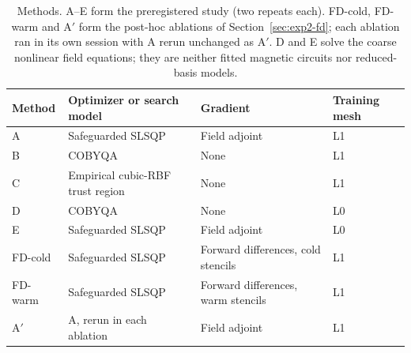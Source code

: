 \begin{table}[H]\centering\small
\caption{Methods. A--E form the preregistered study (two repeats each).
FD-cold, FD-warm and A$'$ form the post-hoc ablations of
Section~\ref{sec:exp2-fd}; each ablation ran in its own session with A
rerun unchanged as A$'$. D and E solve the coarse nonlinear field
equations; they are neither fitted magnetic circuits nor reduced-basis
models.}
\label{tab:methods}
\begin{tabular}{llll}\toprule
Method & Optimizer or search model & Gradient & Training mesh\\\midrule
A & Safeguarded SLSQP & Field adjoint & L1\\
B & COBYQA & None & L1\\
C & Empirical cubic-RBF trust region & None & L1\\
D & COBYQA & None & L0\\
E & Safeguarded SLSQP & Field adjoint & L0\\\addlinespace
FD-cold & Safeguarded SLSQP & Forward differences, cold stencils & L1\\
FD-warm & Safeguarded SLSQP & Forward differences, warm stencils & L1\\
A$'$ & A, rerun in each ablation & Field adjoint & L1\\\bottomrule
\end{tabular}
\end{table}

